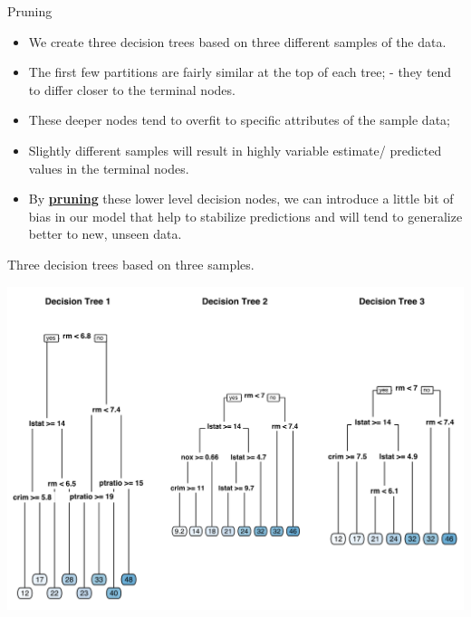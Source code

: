 \documentclass[
  10pt,
  ignorenonframetext,
]{beamer}
\providecommand{\tightlist}{%
  \setlength{\itemsep}{0pt}\setlength{\parskip}{0pt}}
\begin{document}
\begin{frame}{Pruning}
\protect\hypertarget{pruning}{}

\begin{itemize}
\tightlist
\item
  We create three decision trees based on three different samples of the
  data.
\item
  The first few partitions are fairly similar at the top of each tree; -
  they tend to differ closer to the terminal nodes.
\item
  These deeper nodes tend to overfit to specific attributes of the
  sample data;
\item
  Slightly different samples will result in highly variable estimate/
  predicted values in the terminal nodes.
\item
  By
  \href{https://dzone.com/articles/decision-trees-and-pruning-in-r}{\textbf{pruning}}
  these lower level decision nodes, we can introduce a little bit of
  bias in our model that help to stabilize predictions and will tend to
  generalize better to new, unseen data.
\end{itemize}

\end{frame}

\begin{frame}{Three decision trees based on three samples.}
\protect\hypertarget{three-decision-trees-based-on-three-samples.}{}

\includegraphics{figure/decissiontree.PNG}

\end{frame}
\end{document}
